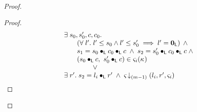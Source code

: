 \begin{lemma}[]
\begin{proof}
\begin{proof}
\begin{align}
\begin{array}{l}
	  \hspace*{0.5cm}\exists\; s_0, s'_0, c, c_0.\; \\
	  \hspace*{1cm}
	  \begin{array}{l}
	  	\left(\forall\; l'.\; l' \leq s_0 \land l' \leq s'_0 \implies l' = \mathbf{0}_{\textsf{L}}\right)\;\land\\
	  	s_1 = s_0 \bullet_{\textsf{L}} c_0 \bullet_{\textsf{L}} c \;\land\; s_2 = s'_0 \bullet_{\textsf{L}} c_0 \bullet_{\textsf{L}} c  \;\land\\
	  	(s_0 \bullet_{\textsf{L}} c,\ s'_0 \bullet_{\textsf{L}} c) \in \varsigma_{i}(\kappa_{}) 
	  \end{array}\\
	  \hspace*{2cm}\lor  \\
		\hspace*{0.5cm}\exists\; r'.\; s_2 = l_i \bullet_{\textsf{L}} r' \;\land\; \varsigma_{\!}\downarrow_{(m-1)} \left(l_i, r', \varsigma_{i}\right)
	\end{array} \label{LAW:Goal2}
\end{align}
%


\end{proof}
\end{proof}
\end{lemma}

